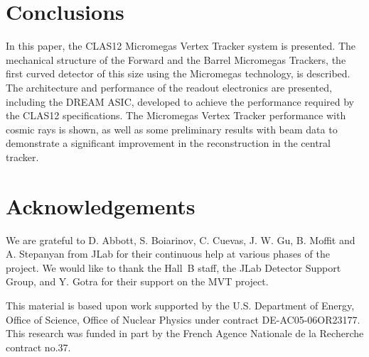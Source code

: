\section{Conclusions}

In this paper, the CLAS12 Micromegas Vertex Tracker system is presented. The mechanical structure of the
Forward and the Barrel Micromegas Trackers, the first curved detector of this size using the Micromegas technology,
is described. The architecture and performance of the readout electronics are presented, including the DREAM ASIC,
developed to achieve the performance required by the CLAS12 specifications. The Micromegas Vertex Tracker
performance with cosmic rays is shown, as well as some preliminary results with beam data to demonstrate a significant
improvement in the reconstruction in the central tracker.

\section{Acknowledgements}

We are grateful to D. Abbott, S. Boiarinov, C. Cuevas, J. W. Gu, B. Moffit and A. Stepanyan from JLab for their continuous help at various phases of the project.
We would like to thank the Hall~B staff, the JLab Detector Support Group, and Y. Gotra for their support on the MVT project.

This material is based upon work supported by the U.S. Department of Energy, Office of Science, Office of Nuclear 
Physics under contract DE-AC05-06OR23177.
This research was funded in part by the French Agence Nationale de la Recherche contract no.37.